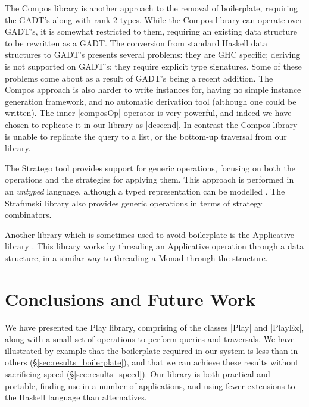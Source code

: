 \documentclass[preprint]{sigplanconf}
\begin{document}
The Compos library \cite{bringert:compos} is another approach to the removal of boilerplate, requiring the GADT's \cite{spj:gadt} along with rank-2 types. While the Compos library can operate over GADT's, it is somewhat restricted to them, requiring an existing data structure to be rewritten as a GADT. The conversion from standard Haskell data structures to GADT's presents several problems: they are GHC specific; deriving is not supported on GADT's; they require explicit type signatures. Some of these problems come about as a result of GADT's being a recent addition. The Compos approach is also harder to write instances for, having no simple instance generation framework, and no automatic derivation tool (although one could be written). The inner |composOp| operator is very powerful, and indeed we have chosen to replicate it in our library as |descend|. In contrast the Compos library is unable to replicate the query to a list, or the bottom-up traversal from our library.

The Stratego tool \cite{stratego} provides support for generic operations, focusing on both the operations and the strategies for applying them. This approach is performed in an \textit{untyped} language, although a typed representation can be modelled \cite{lammel:typed_generic_strategies}. The Strafunski library \cite{lammel:polymorphic_symphony} also provides generic operations in terms of strategy combinators.

Another library which is sometimes used to avoid boilerplate is the Applicative library \cite{mcbride:applicative}. This library works by threading an Applicative operation through a data structure, in a similar way to threading a Monad through the structure.


\section{Conclusions and Future Work}
\label{sec:conclusion}

We have presented the Play library, comprising of the classes |Play| and |PlayEx|, along with a small set of operations to perform queries and traversals. We have illustrated by example that the boilerplate required in our system is less than in others (\S\ref{sec:results_boilerplate}), and that we can achieve these results without sacrificing speed (\S\ref{sec:results_speed}). Our library is both practical and portable, finding use in a number of applications, and using fewer extensions to the Haskell language than alternatives.
\end{document}
